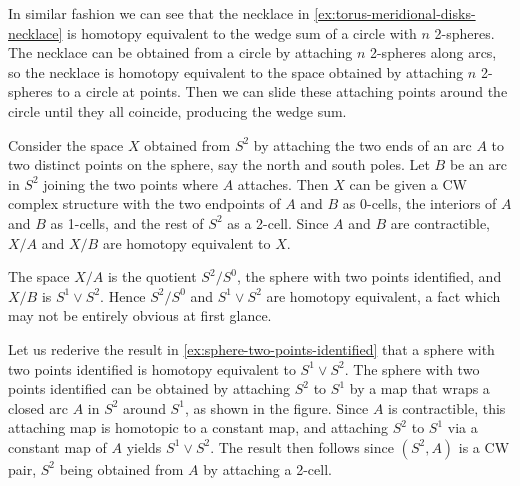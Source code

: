 \begin{example}
\label{ex:necklace-attaching-spheres-circle}
In similar fashion we can see that the necklace in \cref{ex:torus-meridional-disks-necklace}
is homotopy equivalent to the wedge sum of a circle with $n$ 2-spheres. The necklace
can be obtained from a circle by attaching $n$ 2-spheres along arcs, so the necklace is
homotopy equivalent to the space obtained by attaching $n$ 2-spheres to a circle at
points. Then we can slide these attaching points around the circle until they all
coincide, producing the wedge sum.
\end{example}

\begin{example}
\label{ex:sphere-two-points-identified}
Consider the space $X$ obtained from $S^2$ by attaching the two ends of an arc $A$
to two distinct points on the sphere, say the north and south poles. Let $B$ be an arc
in $S^2$ joining the two points where $A$ attaches. Then $X$ can be given a CW complex
structure with the two endpoints of $A$ and $B$ as 0-cells, the interiors of $A$ and $B$ as
1-cells, and the rest of $S^2$ as a 2-cell. Since $A$ and $B$ are contractible, $X/A$ and
$X/B$ are homotopy equivalent to $X$.



The space $X/A$ is the quotient $S^2/S^0$, the sphere with two points identified, and
$X/B$ is $S^1 \vee S^2$. Hence $S^2/S^0$ and $S^1 \vee S^2$ are homotopy equivalent, a fact
which may not be entirely obvious at first glance.
\end{example}

\begin{example}
\label{ex:sphere-two-points-identified-via-attaching}
Let us rederive the result in \cref{ex:sphere-two-points-identified} that a sphere with
two points identified is homotopy equivalent to $S^1 \vee S^2$. The sphere with two
points identified can be obtained by attaching $S^2$ to $S^1$ by a map that wraps a
closed arc $A$ in $S^2$ around $S^1$, as shown in the figure. Since $A$ is contractible,
this attaching map is homotopic to a constant map, and attaching $S^2$ to $S^1$ via a
constant map of $A$ yields $S^1 \vee S^2$. The result then follows since $(S^2,A)$ is a CW
pair, $S^2$ being obtained from $A$ by attaching a 2-cell.


\end{example}

